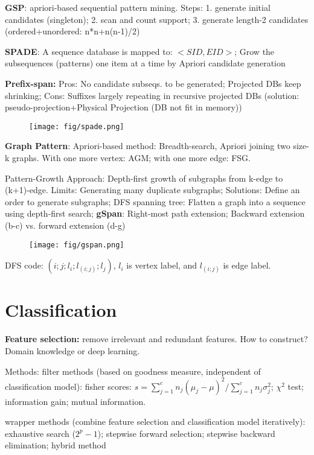 \documentclass[10pt,twocolumn]{article}
\begin{document}
\textbf{GSP}: apriori-based sequential pattern mining.
Steps: 1. generate initial candidates (singleton); 2. scan and count support; 3. generate length-2 candidates (ordered+unordered: n*n+n(n-1)/2) 

\textbf{SPADE}: A sequence database is mapped to: $<SID, EID>$; Grow the subsequences (patterns) one item at a time by Apriori candidate generation

\textbf{Prefix-span:} Pros: No candidate subseqs. to be generated; Projected DBs keep shrinking; Cons: Suffixes largely repeating in recursive projected DBs (solution: pseudo-projection+Physical Projection (DB not fit in memory))
\begin{figure}[!ht]
    \centering
    \texttt{[image: fig/spade.png]}
\end{figure}

\textbf{Graph Pattern}: 
Apriori-based method: Breadth-search, Apriori joining two size-k graphs. With one more vertex: AGM; with one more edge: FSG. 

Pattern-Growth Approach: Depth-first growth of subgraphs from k-edge to (k+1)-edge. Limits: Generating many duplicate subgraphs; Solutions: Define an order to generate subgraphs; DFS spanning tree: Flatten a graph into a sequence using depth-first search; \textbf{gSpan}: Right-most path extension; Backward extension (b-c) vs. forward extension (d-g)
\begin{figure}[!ht]
    \centering
    \texttt{[image: fig/gspan.png]}
\end{figure}
DFS code: $(i; j; l_i; l_{(i;j)}; l_j )$, $l_i$ is vertex label, and $l_{(i;j)}$ is edge label.

\section{Classification}
\textbf{Feature selection:} remove irrelevant and redundant features. How to construct? Domain knowledge or deep learning. 

Methods: 
filter methods (based on goodness measure, independent of classification model): fisher scores:
$s=\sum_{j=1}^cn_j(\mu_j-\mu)^2/\sum_{j=1}^c n_j\sigma_j^2$; $\chi^2$ test; information gain; mutual information.

wrapper methods (combine feature selection and classification model iteratively): exhaustive search ($2^p-1$); stepwise forward selection; stepwise backward elimination; hybrid method
\end{document}
